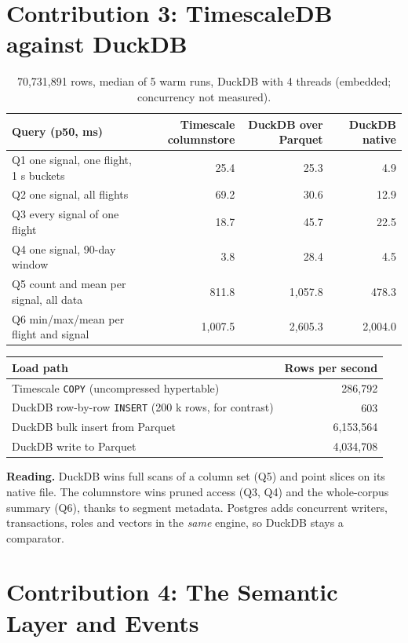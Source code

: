 \documentclass[11pt,a4paper]{article}
\newcommand{\code}[1]{\texttt{#1}}
\begin{document}
\section{Contribution 3: TimescaleDB against DuckDB}\label{sec:engines}
\begin{table}[H]
\centering
\small
\begin{tabular}{lrrr}
\toprule
Query (p50, ms) & Timescale columnstore & DuckDB over Parquet & DuckDB native\\
\midrule
Q1 one signal, one flight, 1 s buckets & 25.4 & 25.3 & 4.9\\
Q2 one signal, all flights & 69.2 & 30.6 & 12.9\\
Q3 every signal of one flight & 18.7 & 45.7 & 22.5\\
Q4 one signal, 90-day window & 3.8 & 28.4 & 4.5\\
Q5 count and mean per signal, all data & 811.8 & 1,057.8 & 478.3\\
Q6 min/max/mean per flight and signal & 1,007.5 & 2,605.3 & 2,004.0\\
\bottomrule
\end{tabular}
\caption{70,731,891 rows, median of 5 warm runs, DuckDB with 4 threads (embedded; concurrency not measured).}
\end{table}
\begin{table}[H]
\centering
\small
\begin{tabular}{lr}
\toprule
Load path & Rows per second\\
\midrule
Timescale \code{COPY} (uncompressed hypertable) & 286,792\\
DuckDB row-by-row \code{INSERT} (200 k rows, for contrast) & 603\\
DuckDB bulk insert from Parquet & 6,153,564\\
DuckDB write to Parquet & 4,034,708\\
\bottomrule
\end{tabular}
\end{table}
\textbf{Reading.} DuckDB wins full scans of a column set (Q5) and point slices on its native file. The columnstore wins pruned access (Q3, Q4) and the whole-corpus summary (Q6), thanks to segment metadata. Postgres adds concurrent writers, transactions, roles and vectors in the \emph{same} engine, so DuckDB stays a comparator.

\section{Contribution 4: The Semantic Layer and Events}\label{sec:events}
\end{document}
